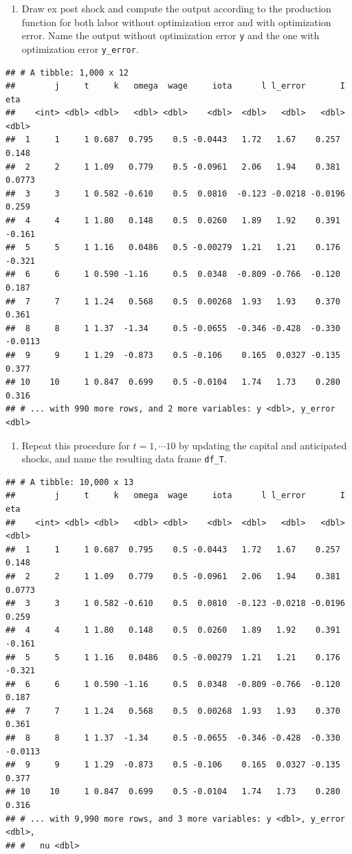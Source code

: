 \documentclass[]{book}
\providecommand{\tightlist}{%
  \setlength{\itemsep}{0pt}\setlength{\parskip}{0pt}}
\begin{document}
\begin{enumerate}
\def\labelenumi{\arabic{enumi}.}
\setcounter{enumi}{7}
\tightlist
\item
  Draw ex post shock and compute the output according to the production
  function for both labor without optimization error and with
  optimization error. Name the output without optimization error
  \texttt{y} and the one with optimization error \texttt{y\_error}.
\end{enumerate}

\begin{verbatim}
## # A tibble: 1,000 x 12
##        j     t     k   omega  wage     iota      l l_error       I     eta
##    <int> <dbl> <dbl>   <dbl> <dbl>    <dbl>  <dbl>   <dbl>   <dbl>   <dbl>
##  1     1     1 0.687  0.795    0.5 -0.0443   1.72   1.67    0.257   0.148 
##  2     2     1 1.09   0.779    0.5 -0.0961   2.06   1.94    0.381   0.0773
##  3     3     1 0.582 -0.610    0.5  0.0810  -0.123 -0.0218 -0.0196  0.259 
##  4     4     1 1.80   0.148    0.5  0.0260   1.89   1.92    0.391  -0.161 
##  5     5     1 1.16   0.0486   0.5 -0.00279  1.21   1.21    0.176  -0.321 
##  6     6     1 0.590 -1.16     0.5  0.0348  -0.809 -0.766  -0.120   0.187 
##  7     7     1 1.24   0.568    0.5  0.00268  1.93   1.93    0.370   0.361 
##  8     8     1 1.37  -1.34     0.5 -0.0655  -0.346 -0.428  -0.330  -0.0113
##  9     9     1 1.29  -0.873    0.5 -0.106    0.165  0.0327 -0.135   0.377 
## 10    10     1 0.847  0.699    0.5 -0.0104   1.74   1.73    0.280   0.316 
## # ... with 990 more rows, and 2 more variables: y <dbl>, y_error <dbl>
\end{verbatim}

\begin{enumerate}
\def\labelenumi{\arabic{enumi}.}
\setcounter{enumi}{8}
\tightlist
\item
  Repeat this procedure for \(t = 1, \cdots 10\) by updating the capital
  and anticipated shocks, and name the resulting data frame
  \texttt{df\_T}.
\end{enumerate}

\begin{verbatim}
## # A tibble: 10,000 x 13
##        j     t     k   omega  wage     iota      l l_error       I     eta
##    <int> <dbl> <dbl>   <dbl> <dbl>    <dbl>  <dbl>   <dbl>   <dbl>   <dbl>
##  1     1     1 0.687  0.795    0.5 -0.0443   1.72   1.67    0.257   0.148 
##  2     2     1 1.09   0.779    0.5 -0.0961   2.06   1.94    0.381   0.0773
##  3     3     1 0.582 -0.610    0.5  0.0810  -0.123 -0.0218 -0.0196  0.259 
##  4     4     1 1.80   0.148    0.5  0.0260   1.89   1.92    0.391  -0.161 
##  5     5     1 1.16   0.0486   0.5 -0.00279  1.21   1.21    0.176  -0.321 
##  6     6     1 0.590 -1.16     0.5  0.0348  -0.809 -0.766  -0.120   0.187 
##  7     7     1 1.24   0.568    0.5  0.00268  1.93   1.93    0.370   0.361 
##  8     8     1 1.37  -1.34     0.5 -0.0655  -0.346 -0.428  -0.330  -0.0113
##  9     9     1 1.29  -0.873    0.5 -0.106    0.165  0.0327 -0.135   0.377 
## 10    10     1 0.847  0.699    0.5 -0.0104   1.74   1.73    0.280   0.316 
## # ... with 9,990 more rows, and 3 more variables: y <dbl>, y_error <dbl>,
## #   nu <dbl>
\end{verbatim}
\end{document}
